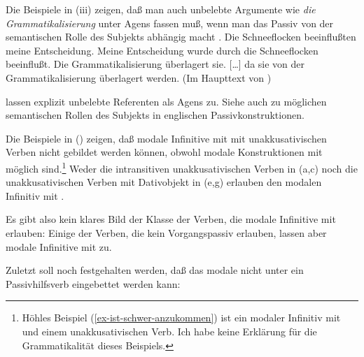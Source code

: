 {        Die Beispiele in (iii) zeigen, daß man auch unbelebte 
        Argumente wie \emph{die Grammatikalisierung} unter Agens fassen muß, wenn
        man das Passiv von der semantischen Rolle des Subjekts abhängig macht \citep[Kapitel~3.1.2]{Mueller2002b}.
        \eal
\ex Die Schneeflocken beeinflußten meine Entscheidung.
\ex Meine Entscheidung wurde durch die Schneeflocken beeinflußt.
\ex Die Grammatikalisierung überlagert sie.
\ex {} [\ldots] da    sie  von der Grammatikalisierung überlagert werden. (Im Haupttext von )
\zl

        \citet[]{HW95a} lassen explizit unbelebte Referenten als Agens zu.
        Siehe auch  zu möglichen semantischen Rollen des Subjekts in
        englischen Passivkonstruktionen.%
}

\noindent
Die Beispiele in () zeigen, daß modale Infinitive mit \sein mit unakkusativischen
Verben nicht gebildet werden können, obwohl modale Konstruktionen mit \haben möglich sind.\footnote{
        Höhles Beispiel (\ref{ex-ist-schwer-anzukommen}) ist ein modaler Infinitiv mit
        \sein und einem unakkusativischen Verb. Ich habe keine Erklärung für die Grammatikalität dieses Beispiels.
}
\eal
{}
\zl
Weder die intransitiven unakkusativischen Verben in (a,c) noch die
unakkusativischen Verben mit Dativobjekt in (e,g) erlauben 
den modalen Infinitiv mit \sein.

Es gibt also kein klares Bild der Klasse der Verben, die modale Infinitive mit \sein erlauben:
Einige der Verben, die kein Vorgangspassiv erlauben, lassen aber modale Infinitive mit \sein
zu.%

Zuletzt soll noch festgehalten werden, daß das modale \sein nicht unter ein Passivhilfsverb
eingebettet werden kann:
\z
%
%


